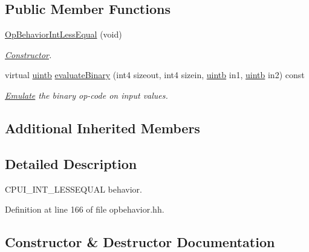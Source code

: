 \subsection*{Public Member Functions}
\begin{DoxyCompactItemize}
\item 
\mbox{\hyperlink{class_op_behavior_int_less_equal_af520f4eb76721ae03c853bdba005f737}{Op\+Behavior\+Int\+Less\+Equal}} (void)
\begin{DoxyCompactList}\small\item\em \mbox{\hyperlink{class_constructor}{Constructor}}. \end{DoxyCompactList}\item 
virtual \mbox{\hyperlink{types_8h_a2db313c5d32a12b01d26ac9b3bca178f}{uintb}} \mbox{\hyperlink{class_op_behavior_int_less_equal_a363b55cdb62281f6f2d6f53f2963c435}{evaluate\+Binary}} (int4 sizeout, int4 sizein, \mbox{\hyperlink{types_8h_a2db313c5d32a12b01d26ac9b3bca178f}{uintb}} in1, \mbox{\hyperlink{types_8h_a2db313c5d32a12b01d26ac9b3bca178f}{uintb}} in2) const
\begin{DoxyCompactList}\small\item\em \mbox{\hyperlink{class_emulate}{Emulate}} the binary op-\/code on input values. \end{DoxyCompactList}\end{DoxyCompactItemize}
\subsection*{Additional Inherited Members}


\subsection{Detailed Description}
C\+P\+U\+I\+\_\+\+I\+N\+T\+\_\+\+L\+E\+S\+S\+E\+Q\+U\+AL behavior. 

Definition at line 166 of file opbehavior.\+hh.



\subsection{Constructor \& Destructor Documentation}
\mbox{\label{class_op_behavior_int_less_equal_af520f4eb76721ae03c853bdba005f737}} 
